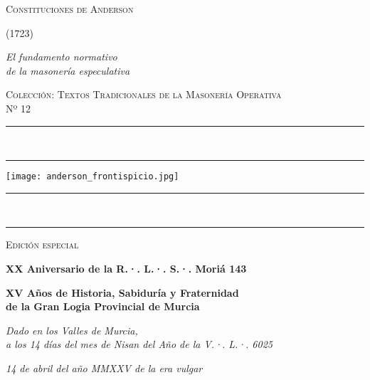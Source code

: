 \documentclass[a4paper,12pt,twoside]{book}
\newcommand{\ornline}{%
\begin{center}
\textcolor{dorado}{{\LARGE\rule{0.2\textwidth}{0.4pt}}~\scalebox{1.2}{❧}~\scalebox{1.2}{❧}~\scalebox{1.2}{❧}~
{\LARGE\rule{0.2\textwidth}{0.4pt}}}
\end{center}}
\begin{document}
\frontmatter

\begin{titlepage}
\begin{center}

\vspace*{1.5cm}

{\Huge\scshape\textcolor{borgoña}{Constituciones de Anderson}}

\vspace{1cm}

{\Large\scshape\textcolor{borgoña}{(1723)}}

\vspace{1cm}

{\Large\itshape El fundamento normativo\\de la masonería especulativa}

\vspace{1cm}

{\large\scshape Colección: Textos Tradicionales de la Masonería Operativa\\Nº 12}

\vspace{1cm}

\ornline

\vspace{0.5cm}

\texttt{[image: anderson\_frontispicio.jpg]}

\vspace{0.5cm}

\ornline

\vspace{1.5cm}

{\large\scshape Edición especial}

\vspace{0.5cm}

{\Large\bfseries XX Aniversario de la R.·. L.·. S.·. Moriá 143}

\vspace{1cm}

{\Large\bfseries XV Años de Historia, Sabiduría y Fraternidad\\de la Gran Logia Provincial de Murcia}

\vspace{1cm}

{\normalsize\itshape Dado en los Valles de Murcia,\\a los 14 días del mes de Nisan del Año de la V.·. L.·. 6025}

\vspace{0.5cm}

{\normalsize\itshape 14 de abril del año MMXXV de la era vulgar}

\end{center}
\end{titlepage}
\end{document}
